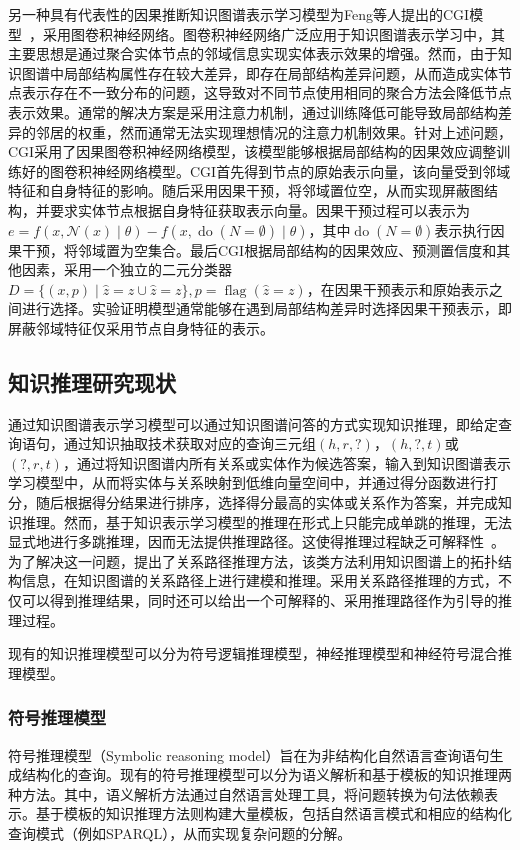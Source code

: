 \documentclass[algorithmlist, AutoFakeBold, AutoFakeSlant, figurelist, tablelist, nomlist, masters]{seuthesix}
\begin{document}
另一种具有代表性的因果推断知识图谱表示学习模型为Feng等人提出的CGI模型~\cite{feng2021should}，采用图卷积神经网络。图卷积神经网络广泛应用于知识图谱表示学习中，其主要思想是通过聚合实体节点的邻域信息实现实体表示效果的增强。然而，由于知识图谱中局部结构属性存在较大差异，即存在局部结构差异问题，从而造成实体节点表示存在不一致分布的问题，这导致对不同节点使用相同的聚合方法会降低节点表示效果。通常的解决方案是采用注意力机制，通过训练降低可能导致局部结构差异的邻居的权重，然而通常无法实现理想情况的注意力机制效果。针对上述问题，CGI采用了因果图卷积神经网络模型，该模型能够根据局部结构的因果效应调整训练好的图卷积神经网络模型。CGI首先得到节点的原始表示向量，该向量受到邻域特征和自身特征的影响。随后采用因果干预，将邻域置位空，从而实现屏蔽图结构，并要求实体节点根据自身特征获取表示向量。因果干预过程可以表示为$e=f(x, \mathcal{N}(x) \mid \theta)-f(x, \operatorname{do}(N=\emptyset) \mid \theta)$，其中$\operatorname{do}(N=\emptyset)$表示执行因果干预，将邻域置为空集合。最后CGI根据局部结构的因果效应、预测置信度和其他因素，采用一个独立的二元分类器$D=\{(x, p) \mid \hat{z}=z \cup \hat{z}=z\}, p=\operatorname{flag}(\hat{z}=z)$，在因果干预表示和原始表示之间进行选择。实验证明模型通常能够在遇到局部结构差异时选择因果干预表示，即屏蔽邻域特征仅采用节点自身特征的表示。

\subsection{知识推理研究现状}
通过知识图谱表示学习模型可以通过知识图谱问答的方式实现知识推理，即给定查询语句，通过知识抽取技术获取对应的查询三元组$\left(h, r, ?\right)$，$\left(h, ?, t\right)$或$\left(?, r, t\right)$，通过将知识图谱内所有关系或实体作为候选答案，输入到知识图谱表示学习模型中，从而将实体与关系映射到低维向量空间中，并通过得分函数进行打分，随后根据得分结果进行排序，选择得分最高的实体或关系作为答案，并完成知识推理。然而，基于知识表示学习模型的推理在形式上只能完成单跳的推理，无法显式地进行多跳推理，因而无法提供推理路径。这使得推理过程缺乏可解释性~\cite{wang2019deeppath}。为了解决这一问题，提出了关系路径推理方法，该类方法利用知识图谱上的拓扑结构信息，在知识图谱的关系路径上进行建模和推理。采用关系路径推理的方式，不仅可以得到推理结果，同时还可以给出一个可解释的、采用推理路径作为引导的推理过程。

现有的知识推理模型可以分为符号逻辑推理模型，神经推理模型和神经符号混合推理模型。

\subsubsection{符号推理模型}
符号推理模型（Symbolic reasoning model）旨在为非结构化自然语言查询语句生成结构化的查询。现有的符号推理模型可以分为语义解析和基于模板的知识推理两种方法。其中，语义解析方法通过自然语言处理工具，将问题转换为句法依赖表示。基于模板的知识推理方法则构建大量模板，包括自然语言模式和相应的结构化查询模式（例如SPARQL），从而实现复杂问题的分解。
\end{document}
